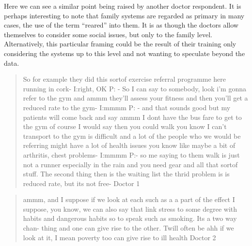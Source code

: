 Here we can see a similar point being raised by another doctor respondent. It is perhaps interesting to note that family systems are regarded as primary in many cases, the use of the term ``reared'' into them. It is as though the doctors allow themselves to consider some social issues, but only to the family level. Alternatively, this particular framing could be the result of their training only considering the systems up to this level and not wanting to speculate beyond the data. 

\begin{quotation}
  So for example they did this sortof exercise referral programme here running in cork-
I:right, OK
P: - So I can say to somebody, look i'm gonna refer to the gym and ammm they'll assess your fitness  and then you'll get a reduced rate to the gym-
I:mmmm
P: - and that sounds good but my patients will come back and say ammm I dont have the bus fare to get to the gym of course I would say then you could walk you know I can't transport to the gym is difficult and a lot of the people who we would be referring might have a lot of health issues you know like maybe a bit of arthritis, chest problems-
I:mmmm
P:- so me saying to them walk is just not a runner especially in the rain and you need gear and all that sortof stuff. The second thing then is the waiting list the thrid problem is is reduced rate, but its not free-
Doctor 1
\end{quotation}


\begin{quotation}
  ammm, and I suppose if we look at each such as a a part of the effect I suppose, you know, we can also say that link stress to some degree with habits and dangerous habits so to speak such as smoking. Its a two way chan- thing and one can give rise to the other. Twill often be ahh if we look at it, I mean poverty too can give rise to ill health
Doctor 2
\end{quotation}


